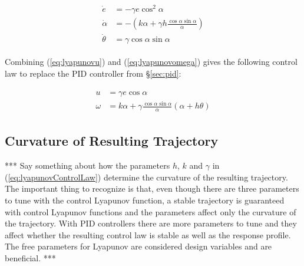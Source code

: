 \begin{align}
\label{eq:lyapunovfinalkinematics}
\begin{split}
\dot{e} &= -\gamma e\cos^2\alpha \\
\dot{\alpha} &= -\left(k\alpha + \gamma h\frac{\cos\alpha\sin\alpha}{\alpha}\right) \\
\dot{\theta} &= \gamma\cos\alpha\sin\alpha
\end{split}
\end{align}

Combining (\ref{eq:lyapunovu}) and (\ref{eq:lyapunovomega}) gives the following control law to replace the PID controller from \S\ref{sec:pid}:

\begin{align}
\label{eq:lyapunovControlLaw}
\begin{split}
u &= \gamma e\cos\alpha \\
\omega &= k\alpha + \gamma\frac{\cos\alpha\sin\alpha}{\alpha}\left(\alpha+h\theta\right)
\end{split}
\end{align}

\subsection{Curvature of Resulting Trajectory}
\label{sec:trajectoryCurvature}
*** Say something about how the parameters $h$, $k$ and $\gamma$ in (\ref{eq:lyapunovControlLaw}) determine the curvature of the resulting trajectory. The important thing to recognize is that, even though there are three parameters to tune with the control Lyapunov function, a stable trajectory is guaranteed with control Lyapunov functions and the parameters affect only the curvature of the trajectory. With PID controllers there are more parameters to tune and they affect whether the resulting control law is stable as well as the response profile. The free parameters for Lyapunov are considered design variables and are beneficial. ***